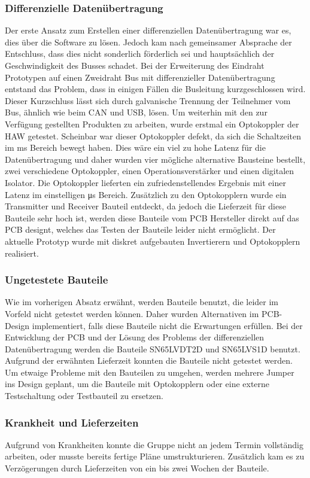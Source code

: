 \subsubsection{Differenzielle Datenübertragung}
Der erste Ansatz zum Erstellen einer differenziellen Datenübertragung war es, dies über die Software zu lösen. Jedoch kam nach gemeinsamer Absprache der Entschluss, dass dies nicht sonderlich förderlich sei und hauptsächlich der Geschwindigkeit des Busses schadet. Bei der Erweiterung des Eindraht Prototypen auf einen Zweidraht Bus mit differenzieller Datenübertragung entstand das Problem, dass in einigen Fällen die Busleitung kurzgeschlossen wird. Dieser Kurzschluss lässt sich durch galvanische Trennung der Teilnehmer vom Bus, ähnlich wie beim CAN und USB, lösen. Um weiterhin mit den zur Verfügung gestellten Produkten zu arbeiten, wurde erstmal ein Optokoppler der HAW getestet. Scheinbar war dieser Optokoppler defekt, da sich die Schaltzeiten im \si{ms} Bereich bewegt haben. Dies wäre ein viel zu hohe Latenz für die Datenübertragung und daher wurden vier mögliche alternative Bausteine bestellt, zwei verschiedene Optokoppler, einen Operationsverstärker und einen digitalen Isolator. Die Optokoppler lieferten ein zufriedenstellendes Ergebnis mit einer Latenz im einstelligen \si{\micro\second} Bereich. Zusätzlich zu den Optokopplern wurde ein Transmitter und Receiver Bauteil entdeckt, da jedoch die Lieferzeit für diese Bauteile sehr hoch ist, werden diese Bauteile vom PCB Hersteller direkt auf das PCB designt, welches das Testen der Bauteile leider nicht ermöglicht. Der aktuelle Prototyp wurde mit diskret aufgebauten Invertierern und Optokopplern realisiert.

\subsubsection{Ungetestete Bauteile}
Wie im vorherigen Absatz erwähnt, werden Bauteile benutzt, die leider im Vorfeld nicht getestet werden können. Daher wurden Alternativen im PCB-Design implementiert, falls diese Bauteile nicht die Erwartungen erfüllen. Bei der Entwicklung der PCB und der Lösung des Problems der differenziellen Datenübertragung werden die Bauteile SN65LVDT2D und SN65LVS1D benutzt. Aufgrund der erwähnten Lieferzeit konnten die Bauteile nicht getestet werden. Um etwaige Probleme mit den Bauteilen zu umgehen, werden mehrere Jumper ins Design geplant, um die Bauteile mit Optokopplern oder eine externe Testschaltung oder Testbauteil zu ersetzen.

\subsubsection{Krankheit und Lieferzeiten}
Aufgrund von Krankheiten konnte die Gruppe nicht an jedem Termin vollständig arbeiten, oder musste bereits fertige Pläne umstrukturieren. Zusätzlich kam es zu Verzögerungen durch Lieferzeiten von ein bis zwei Wochen der Bauteile.

